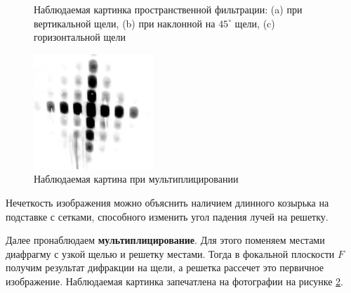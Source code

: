 \documentclass[12pt]{kiarticle}
\begin{document}
\begin{figure}[h]
\begin{minipage}[h]{0.3\linewidth}
		\end{minipage}
		\caption{Наблюдаемая картинка пространственной фильтрации: (a) при вертикальной щели, (b) при наклонной на $45^\circ$ щели, (c) горизонтальной щели }
		\label{rotate}
	\end{figure}

	\begin{figure}[h!]
	\centering	
	\includegraphics[width=0.4\textwidth]{mult.png}
	\caption{Наблюдаемая картина при мультиплицировании}
	\label{mult}
\end{figure}
	
	Нечеткость изображения можно объяснить наличием длинного козырька на подставке с сетками, способного изменить угол падения лучей на решетку.
	
	Далее пронаблюдаем \textbf{мультиплицирование}. Для этого поменяем местами диафрагму с узкой щелью и решетку местами. Тогда в фокальной плоскости $F$ получим результат дифракции на щели, а решетка рассечет это первичное изображение. Наблюдаемая картинка запечатлена на фотографии на рисунке \ref{mult}. 
\end{document}
